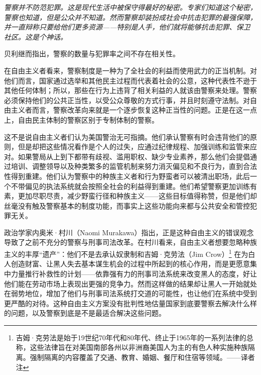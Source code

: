\documentclass[fontset=fandol, a4paper, 12pt, openright]{ctexbook}
\renewenvironment{quote}
  {\list{}{\rightmargin\leftmargin}%
   \item\relax\small\itshape\color{black}}
  {\endlist}
\begin{document}
\begin{quote}
警察并不防范犯罪。这是现代生活中被保守得最好的秘密。专家们知道这个秘密，警察也知道，但是公众并不知道。然而警察却装扮成社会中抗击犯罪的最强保障，并一直辩称只要给他们更多资源——特别是人手，他们就将能够抗击犯罪、保卫社区。这是个神话。
\end{quote}

贝利继而指出，警察的数量与犯罪率之间不存在相关性。

在自由主义者看来，警察制度是一种为了全社会的利益而使用武力的正当机制。对他们而言，国家通过选举和其他民主过程而代表着社会的公意，这种代表性不逊于其他任何体制；所以，那些在行为上违背了相关利益的人就该由警察来处理。警察必须保持他们的公共正当性，以受公众尊敬的方式行事，并且时刻遵守法制。对自由主义者而言，警察改革向来就是一个逐步恢复这种正当性的问题。正是在这一点上，自由民主体制的警察区别于专制体制的警察。

这不是说自由主义者们认为美国警治无可指摘。他们承认警察有时会违背他们的原则，但是却把这些情况看作是个人的过失，应通过纪律规程、加强训练和监管来应对。如果警局从上到下都带有歧视、滥用职权、缺少专业素养，那么他们会提倡通过培训、调整领导以及种类繁多的监管机制来努力消灭偏见和不良行为，直到合法性得到重建。他们认为警察中的种族主义者和行为野蛮者可以被清出职场，此后一个不带偏见的执法系统就会按照全社会的利益得到重建。他们希望警察更加训练有素，更加尽职尽责，减少野蛮行径和种族主义——这些目标值得称赞，但是他们却丝毫没有触及警察基本的制度功能，而事实上这些功能向来都与公共安全和管控犯罪无关。

政治学家内奥米·村川（Naomi Murakawa）指出，正是这种自由主义的错误观念导致了之前不充分的警察与刑事司法改革。在村川看来，自由主义者想要忽略种族主义的丰厚“遗产”：他们不是去承认奴隶制和吉姆·克劳法（Jim Crow）\footnote{吉姆·克劳法是始于19世纪70年代和80年代、终止于1965年的一系列法律的总称，这些法律旨在对美国南部各州以非洲裔美国人为主的有色人种实施种族隔离。强制隔离的内容覆盖了交通、教育、婚姻、餐厅和住宿等领域。——译者注} 在为白人创造财富、让黑人失去基本谋生机会的过程中所起到的核心作用，而是更愿意集中力量推行补救性的计划——依靠强有力的刑事司法系统来改变黑人的态度，好让他们能在劳动市场上表现出更强的竞争力。然而这样做的结果却让黑人一开始就处在弱势地位，增加了他们与刑事司法系统打交道的可能性，也让他们在系统中受到更严酷的对待。这种自由主义方案没有批判性地估量国家到底要警察去解决什么样的问题，以及警察到底是不是最适合解决这些问题。
\end{document}
